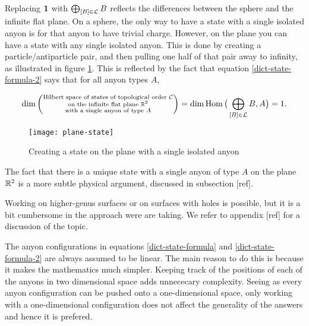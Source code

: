 \begin{rem}
Replacing ${\mathbf 1}$ with $\bigoplus_{[B]\in {\mathcal L}} B$ reflects the differences between the sphere and the infinite flat plane. On a sphere, the only way to have a state with a single isolated anyon is for that anyon to have trivial charge. However, on the plane you can have a state with any single isolated anyon. This is done by creating a particle/antiparticle pair, and then pulling one half of that pair away to infinity, as illustrated in figure \ref{plane-state}. This is reflected by the fact that equation \ref{dict-state-formula-2} says that for all anyon types $A$,

\begin{equation}\label{dict-state-formula-2}
\dim\left(\substack{\text{Hilbert space of states of topological order ${\mathcal C}$} \\ \text{on the infinite flat plane ${\mathbb R}^2$} \\ \text{with a single anyon of type $A$}}\right)
=\dim\operatorname{Hom}\big(\bigoplus_{[B]\in {\mathcal L}}B, A\big)=1.
\end{equation}

\begin{figure}[h]
\begin{center}
\texttt{[image: plane-state]}
\end{center}
\caption{Creating a state on the plane with a single isolated anyon}
\label{plane-state}
\end{figure}

The fact that there is a unique state with a single anyon of type $A$ on the plane ${\mathbb R}^2$ is a more subtle physical argument, discussed in subsection [ref].
\end{rem}

\begin{rem} Working on higher-genus surfaces or on surfaces with holes is possible, but it is a bit cumbersome in the approach were are taking. We refer to appendix [ref] for a discussion of the topic.
\end{rem}

\begin{rem}
The anyon configurations in equations \ref{dict-state-formula} and \ref{dict-state-formula-2} are always assumed to be linear. The main reason to do this is because it makes the mathematics much simpler. Keeping track of the positions of each of the anyons in two dimensional space adds unnececary complexity. Seeing as every anyon configuration can be pushed onto a one-dimensional space, only working with a one-dimensional configuration does not affect the generality of the answers and hence it is prefered.
\end{rem}


